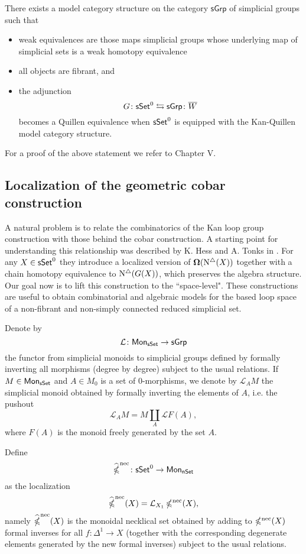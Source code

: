 \begin{theorem} \label{kan} There exists a model category structure on the category $\mathsf{sGrp}$ of simplicial groups such that 
\begin{itemize}
    \item weak equivalences are those maps simplicial groups whose underlying map of simplicial sets is a weak homotopy equivalence
    \item all objects are fibrant, and
\item the adjunction
$$G \colon \mathsf{sSet}^0 \leftrightarrows \mathsf{sGrp}\colon \overline{W}$$
becomes a Quillen equivalence when $\mathsf{sSet}^0$ is equipped with the Kan-Quillen model category structure.
\end{itemize}
\end{theorem}

For a proof of the above statement we refer to \cite{goerss2009simplicial} Chapter V. 

\subsection{Localization of the geometric cobar construction} A natural problem is to relate the combinatorics of the Kan loop group construction with those behind the cobar construction. A starting point for understanding this relationship was described by K. Hess and A. Tonks in \cite{hess2010cobar}. For any $X \in \mathsf{sSet}^0$ they introduce a localized version of $\operatorname{\mathbf{\Omega}}( \operatorname{N^{\triangle}}(X))$ together with a chain homotopy equivalence to $\operatorname{N^{\triangle}} (G(X))$, which preserves the algebra structure. Our goal now is to lift this construction to the ``space-level". These constructions are useful to obtain combinatorial and algebraic models for the based loop space of a non-fibrant and non-simply connected reduced simplicial set. 

Denote by $$\mathcal{L} \colon \mathsf{Mon}_{\mathsf{sSet}} \to \mathsf{sGrp}$$ the functor from simplicial monoids to simplicial groups defined by formally inverting all morphisms (degree by degree) subject to the usual relations. If $M \in \mathsf{Mon}_{\mathsf{sSet}}$ and $A \in M_0$ is a set of $0$-morphisms, we denote by $\mathcal{L}_AM$ the simplicial monoid obtained by formally inverting the elements of $A$, i.e. the pushout
$$\mathcal{L}_AM = M \coprod_{A} \mathcal{L}F(A),$$
where $F(A)$ is the monoid freely generated by the set $A$. 


Define 
$$\widehat{\operatorname{\mathbb{\Omega}}}^{\text{nec}} \colon \mathsf{sSet}^0 \to \mathsf{Mon}_{\mathsf{nSet}}$$
as the localization
$$\widehat{\operatorname{\mathbb{\Omega}}}^{\text{nec}}(X)= \mathcal{L}_{X_1}\operatorname{\mathbb{\Omega}^{\mathrm{nec}}}(X),$$
namely $\widehat{\operatorname{\mathbb{\Omega}}}^{\text{nec}}(X)$ is the monoidal necklical set obtained by adding to $\operatorname{\mathbb{\Omega}^{\mathrm{nec}}}(X)$  formal inverses for all $f\colon \Delta^1 \to X$ (together with the corresponding degenerate elements generated by the new formal inverses) subject to the usual relations. 

